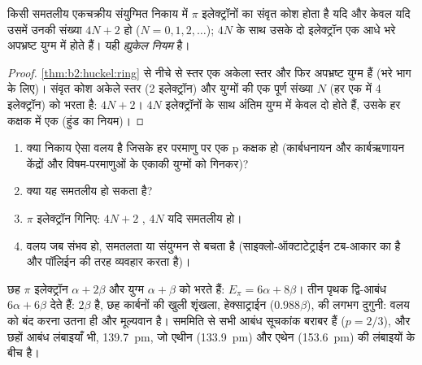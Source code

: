 \begin{theorem}[ह्युकेल नियम]\label{thm:b2:huckel:huckel-rule}
किसी समतलीय एकचक्रीय संयुग्मित निकाय में $\pi$ इलेक्ट्रॉनों का संवृत कोश होता है यदि और केवल
यदि उसमें उनकी संख्या $4N + 2$ हो ($N = 0, 1, 2, \dots$); $4N$ के साथ उसके दो इलेक्ट्रॉन एक
आधे भरे अपभ्रष्ट युग्म में होते हैं। यही \emph{ह्युकेल नियम} है।
\end{theorem}

\begin{proof}
\cref{thm:b2:huckel:ring} से नीचे से स्तर एक अकेला स्तर और
फिर अपभ्रष्ट युग्म हैं (भरे भाग के लिए)। संवृत कोश अकेले
स्तर (2 इलेक्ट्रॉन) और युग्मों की एक पूर्ण संख्या $N$ (हर एक में 4 इलेक्ट्रॉन) को भरता है: $4N + 2$।
$4N$ इलेक्ट्रॉनों के साथ अंतिम युग्म में केवल दो होते हैं, उसके हर कक्षक में एक (हुंड का
नियम)।
\end{proof}

\begin{method}[क्या यह ऐरोमैटिक है?]\label{met:b2:huckel:aromaticity}
\begin{enumerate}
  \item क्या निकाय ऐसा वलय है जिसके हर परमाणु पर एक p कक्षक हो (कार्बधनायन
        और कार्बऋणायन केंद्रों और विषम-परमाणुओं के एकाकी युग्मों को गिनकर)?
  \item क्या यह समतलीय हो सकता है?
  \item $\pi$ इलेक्ट्रॉन गिनिए: $4N + 2$ , $4N$  यदि समतलीय हो।
  \item {} वलय जब संभव हो, समतलता या संयुग्मन से बचता है
        (साइक्लो-ऑक्टाटेट्राईन टब-आकार का है और पॉलिईन की तरह व्यवहार करता है)।
\end{enumerate}
\end{method}

\begin{example}[बेन्ज़ीन]\label{ex:b2:huckel:benzene}
छह $\pi$ इलेक्ट्रॉन $\alpha + 2\beta$ और युग्म $\alpha + \beta$ को भरते हैं: $E_\pi = 6\alpha + 8\beta$।
तीन पृथक द्वि-आबंध $6\alpha + 6\beta$ देते हैं:  $2\beta$ है,
छह कार्बनों की खुली शृंखला, हेक्साट्राईन ($0.988\beta$), की लगभग दुगुनी: वलय को
बंद करना उतना ही और मूल्यवान है। सममिति से सभी आबंध सूचकांक बराबर हैं ($p = 2/3$), और छहों
आबंध लंबाइयाँ भी, \qty{139.7}{pm}, जो एथीन (\qty{133.9}{pm}) और एथेन
(\qty{153.6}{pm}) की लंबाइयों के बीच है।
\end{example}

